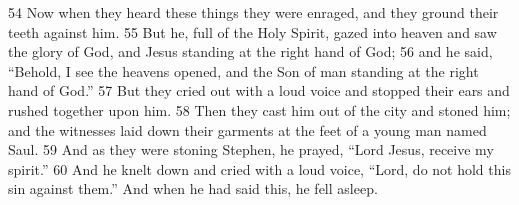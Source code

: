 \documentclass[letterpaper]{report}
\begin{document}
\begin{multicols}{2}
54 Now when they heard these things they were enraged, and they ground their teeth against him. 55 But he, full of the Holy Spirit, gazed into heaven and saw the glory of God, and Jesus standing at the right hand of God; 56 and he said, “Behold, I see the heavens opened, and the Son of man standing at the right hand of God.” 57 But they cried out with a loud voice and stopped their ears and rushed together upon him. 58 Then they cast him out of the city and stoned him; and the witnesses laid down their garments at the feet of a young man named Saul. 59 And as they were stoning Stephen, he prayed, “Lord Jesus, receive my spirit.” 60 And he knelt down and cried with a loud voice, “Lord, do not hold this sin against them.” And when he had said this, he fell asleep.
\end{multicols}

\clearpage
\end{document}
